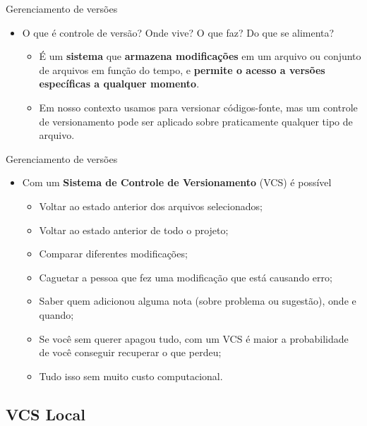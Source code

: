 \documentclass{beamer}
\begin{document}
\begin{frame}{Gerenciamento de versões}
	\begin{itemize}
		\justifying
		\item O que é controle de versão? Onde vive? O que faz? Do que se alimenta?
		\begin{itemize}
			\justifying
			\item<2-> É um \textbf{sistema} que \textbf{armazena modificações} em um arquivo ou conjunto de arquivos em função do tempo, e \textbf{permite o acesso a versões específicas a qualquer momento}.
			\item<3> Em nosso contexto usamos para versionar códigos-fonte, mas um controle de versionamento pode ser aplicado sobre praticamente qualquer tipo de arquivo.
		\end{itemize}
	\end{itemize}
\end{frame}

\begin{frame}{Gerenciamento de versões}
	\begin{itemize}
		\justifying
		\item Com um \textbf{Sistema de Controle de Versionamento} (VCS) é possível
		\begin{itemize}
			\justifying
			\item<2-> Voltar ao estado anterior dos arquivos selecionados;
			\item<3-> Voltar ao estado anterior de todo o projeto;
			\item<4-> Comparar diferentes modificações;
			\item<5-> Caguetar a pessoa que fez uma modificação que está causando erro;
			\item<6-> Saber quem adicionou alguma nota (sobre problema ou sugestão), onde e quando;
			\item<7-> Se você sem querer apagou tudo, com um VCS é maior a probabilidade de você conseguir recuperar o que perdeu;
			\item<8> Tudo isso sem muito custo computacional.
		\end{itemize}
	\end{itemize}
\end{frame}

\subsection{VCS Local}
\end{document}
